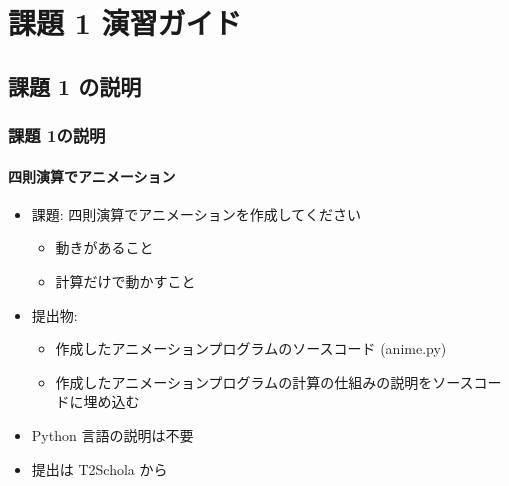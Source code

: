 %
%
\section{課題 1 演習ガイド}
\subsection{課題 1 の説明}
\begin{frame}
\frametitle{課題 1の説明}
\framesubtitle{四則演算でアニメーション}
  \begin{itemize}
\item 課題: 四則演算でアニメーションを作成してください
    \begin{itemize}
\item 動きがあること
\item 計算だけで動かすこと
    \end{itemize}
\item 提出物:
    \begin{itemize}
\item 作成したアニメーションプログラムのソースコード (anime.py)
\item 作成したアニメーションプログラムの計算の仕組みの説明をソースコードに埋め込む
    \end{itemize}
\item Python 言語の説明は不要
\item 提出は T2Schola から
  \end{itemize}
\end{frame}
%
